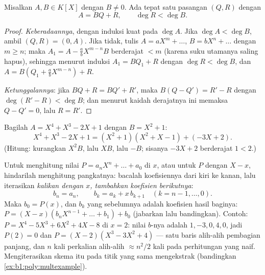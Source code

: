 \begin{theorem}\label{thm:b1:poly:division}
Misalkan $A, B \in K[X]$ dengan $B \neq 0$. Ada tepat satu pasangan $(Q,
R)$  dengan
\[
A = BQ + R, \qquad \deg R < \deg B .
\]
\end{theorem}

\begin{proof}
\emph{Keberadaannya}, dengan induksi kuat pada $\deg A$. Jika $\deg A < \deg
B$, ambil $(Q, R) = (0, A)$. Jika tidak, tulis $A = a X^m + \dots$, $B =
b X^n + \dots$ dengan $m \geq n$; maka  $A_1 = A - \frac ab
X^{m-n} B$ berderajat $< m$ (karena suku utamanya saling hapus), sehingga menurut
induksi $A_1 = BQ_1 + R$ dengan $\deg R < \deg B$, dan $A = B(Q_1 +
\frac ab X^{m-n}) + R$.

\emph{Ketunggalannya}: jika $BQ + R = BQ' + R'$, maka $B(Q - Q') = R' - R$
dengan $\deg(R' - R) < \deg B$; dan menurut kaidah derajatnya ini memaksa $Q - Q'
= 0$, lalu $R = R'$.
\end{proof}

\begin{example}\label{ex:b1:poly:division}
Bagilah $A = X^4 + X^3 - 2X + 1$ dengan $B = X^2 + 1$:
\[
X^4 + X^3 - 2X + 1 = (X^2 + 1)(X^2 + X - 1) + (-3X + 2).
\]
(Hitung: kurangkan $X^2 B$, lalu $X B$, lalu $-B$; sisanya
$-3X + 2$ berderajat $1 < 2$.)
\end{example}

\begin{method}\label{met:b1:poly:horner}
Untuk menghitung nilai $P = a_nX^n + \dots + a_0$ di $x$, atau untuk  $P$ dengan
$X - x$, hindarilah menghitung pangkatnya: bacalah koefisiennya dari kiri ke
kanan, lalu iterasikan \emph{kalikan dengan $x$, tambahkan koefisien
berikutnya}:
\[
b_n = a_n, \qquad b_{k} = a_{k} + x\,b_{k+1}
\quad (k = n-1, \dots, 0) .
\]
Maka $b_0 = P(x)$, dan $b_k$ yang sebelumnya adalah koefisien hasil baginya:
$P = (X - x)(b_nX^{n-1} + \dots + b_1) + b_0$
(jabarkan lalu bandingkan). Contoh: $P = X^4 - 5X^3 + 6X^2 + 4X - 8$
di $x = 2$: nilai $b$-nya adalah $1, -3, 0, 4, 0$, jadi $P(2) = 0$ dan $P
= (X-2)(X^3 - 3X^2 + 4)$ --- satu baris alih-alih pembagian
panjang, dan $n$ kali perkalian alih-alih $\approx n^2/2$ kali
pada perhitungan yang naif. Mengiterasikan skema itu pada titik yang sama
mengekstrak  (bandingkan
\cref{ex:b1:poly:multexample}).
\end{method}

